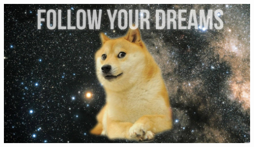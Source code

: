 \documentclass[twoside,titlepage,12pt]{article}
\numberwithin{equation}{section}
\begin{document}





















\includegraphics[width=\textwidth]{Images/follow-your-dreams.jpg}
\end{document}
